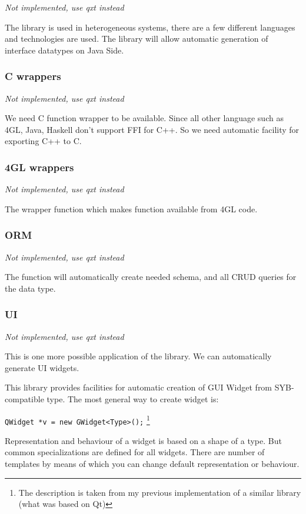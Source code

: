 \documentclass[a4paper]{article}
\begin{document}
\emph{Not implemented, use qxt instead}

The library is used in heterogeneous systems, there are a few different languages and technologies are used.
The library will allow automatic generation of interface datatypes on Java Side.

\subsubsection{C wrappers}

\emph{Not implemented, use qxt instead}

We need C function wrapper to be available. Since all other language such as 4GL, Java, Haskell don't support FFI for C++. 
So we need automatic facility for exporting C++ to C.

\subsubsection{4GL wrappers}

\emph{Not implemented, use qxt instead}

The wrapper function which makes function available from 4GL code.

\subsubsection{ORM}

\emph{Not implemented, use qxt instead}

The function will automatically create needed schema, and all CRUD queries for the data type.

\subsubsection{UI} 

\emph{Not implemented, use qxt instead}

This is one more possible application of the library. We can automatically generate UI widgets.

This library provides facilities for automatic creation of GUI Widget from SYB-compatible type.
The most general way to create widget is:

\lstinline{QWidget *v = new GWidget<Type>();} \footnote{The description is taken from my previous implementation of a similar library 
(what was based on Qt)}

Representation and behaviour of a widget is based on a shape of a type.
But common specializations are defined for all widgets.
There are number of templates by means of which you can change default representation or behaviour.
\end{document}
